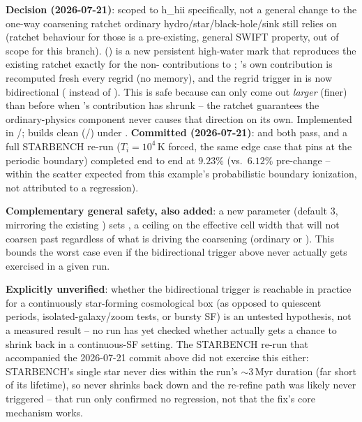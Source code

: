 \begin{itemize}
    \textbf{Decision (2026-07-21)}: scoped to h\_hii specifically, not a
    general change to the one-way coarsening ratchet ordinary
    hydro/star/black-hole/sink  still relies on (ratchet
    behaviour for those is a pre-existing, general SWIFT property, out
    of scope for this branch). 
    () is a new persistent high-water mark that
    reproduces the existing ratchet exactly for the non-
    contributions to ; 's own contribution is
    recomputed fresh every regrid (no memory), and the regrid trigger in
     is now bidirectional (
    instead of ). This is safe because 
    can only come out \emph{larger} (finer) than before when
    's contribution has shrunk -- the ratchet guarantees the
    ordinary-physics component never causes that direction on its own.
    Implemented in /; builds
    clean (/) under
    . \textbf{Committed
    (2026-07-21)}:  and
     both pass, and a full STARBENCH re-run
    ($T_i=10^4\,$K forced, the same edge case that pins
     at the periodic boundary) completed
    end to end at $9.23\%$ (vs.\ $6.12\%$ pre-change -- within the
    scatter expected from this example's probabilistic boundary
    ionization, not attributed to a regression).

    \textbf{Complementary general safety, also added}: a new
     parameter (default 3,
    mirroring the existing ) sets
    , a ceiling on the effective cell width
    that  will not coarsen past regardless of what
    is driving the coarsening (ordinary  or ).
    This bounds the worst case even if the bidirectional trigger above
    never actually gets exercised in a given run.

    \textbf{Explicitly unverified}: whether the bidirectional trigger is
    reachable in practice for a continuously star-forming cosmological
    box (as opposed to quiescent periods, isolated-galaxy/zoom tests, or
    bursty SF) is an untested hypothesis, not a measured result -- no run
    has yet checked whether  actually gets a chance to shrink
    back in a continuous-SF setting. The STARBENCH re-run that
    accompanied the 2026-07-21 commit above did not exercise this either:
    STARBENCH's single star never dies within the run's $\sim$3\,Myr
    duration (far short of its lifetime), so  never shrinks
    back down and the re-refine path was likely never triggered -- that
    run only confirmed no regression, not that the fix's core mechanism
    works.


\end{itemize}

